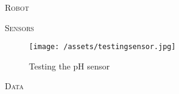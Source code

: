 \documentclass[final,t]{beamer}
\begin{document}
\begin{frame}{}
\begin{columns}[t]
            \begin{column}{.5\linewidth}

                \begin{block}{\textsc{Robot}}
                    \vspace*{6mm}
                    
                \end{block}

                \begin{block}{\textsc{Sensors}}
                    \vspace*{6mm}
                    \begin{figure}
                        \texttt{[image: /assets/testingsensor.jpg]}
                        \caption{Testing the pH sensor}
                    \end{figure}
                \end{block}
                \begin{block}{\textsc{Data}}
                    \vspace*{6mm}
                 

                \end{block}
            \end{column}

          
        \end{columns}
    \end{frame}
\end{document}
